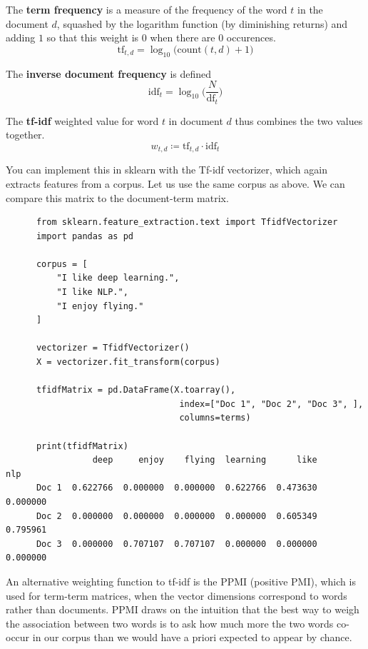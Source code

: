 \documentclass{article}
\begin{document}
    \begin{definition}[TF]
      The \textbf{term frequency} is a measure of the frequency of the word $t$ in the document $d$, squashed by the logarithm function (by diminishing returns) and adding $1$ so that this weight is $0$ when there are $0$ occurences. 
      \[\mathrm{tf}_{t, d} = \log_{10} \big( \mathrm{count}(t, d) + 1 \big)\]
    \end{definition}

    \begin{definition}[IDF]
      The \textbf{inverse document frequency} is defined 
      \[\mathrm{idf}_t = \log_{10} \bigg( \frac{N}{\mathrm{df}_t} \bigg)\]
    \end{definition}

    \begin{definition}[tf-idf]
      The \textbf{tf-idf} weighted value for word $t$ in document $d$ thus combines the two values together. 
      \[w_{t, d} \coloneqq \mathrm{tf}_{t, d} \cdot \mathrm{idf}_{t}\]
    \end{definition}

    You can implement this in sklearn with the Tf-idf vectorizer, which again extracts features from a corpus. Let us use the same corpus as above. We can compare this matrix to the document-term matrix. 
    \begin{lstlisting}
      from sklearn.feature_extraction.text import TfidfVectorizer
      import pandas as pd

      corpus = [
          "I like deep learning.", 
          "I like NLP.", 
          "I enjoy flying."
      ]

      vectorizer = TfidfVectorizer() 
      X = vectorizer.fit_transform(corpus)

      tfidfMatrix = pd.DataFrame(X.toarray(),
                                  index=["Doc 1", "Doc 2", "Doc 3", ],
                                  columns=terms)

      print(tfidfMatrix)
                 deep     enjoy    flying  learning      like       nlp
      Doc 1  0.622766  0.000000  0.000000  0.622766  0.473630  0.000000
      Doc 2  0.000000  0.000000  0.000000  0.000000  0.605349  0.795961
      Doc 3  0.000000  0.707107  0.707107  0.000000  0.000000  0.000000
    \end{lstlisting}

    An alternative weighting function to tf-idf is the PPMI (positive PMI), which is used for term-term matrices, when the vector dimensions correspond to words rather than documents. PPMI draws on the intuition that the best way to weigh the association between two words is to ask how much more the two words co-occur in our corpus than we would have a priori expected to appear by chance. 
\end{document}
